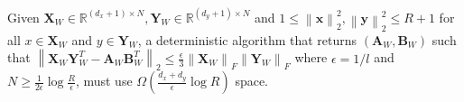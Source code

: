 \begin{theorem}\label{thm:lower-bound-amm-sw}
    Given $\boldsymbol{X}_W\in\mathbb{R}^{(d_x+1)\times N}, \boldsymbol{Y}_W\in\mathbb{R}^{(d_y+1)\times N}$ and $1\leq \left\|\boldsymbol{x}\right\|_2^2, \left\|\boldsymbol{y}\right\|_2^2\leq R+1$ for all $x\in\boldsymbol{X}_W$ and $y\in\boldsymbol{Y}_W$,
    a deterministic algorithm that returns $(\boldsymbol{A}_W, \boldsymbol{B}_W)$ such that
    \(
    \left\| \boldsymbol{X}_W\boldsymbol{Y}_W^T - \boldsymbol{A}_W\boldsymbol{B}_W^T\right\|_2 \leq \frac{\epsilon}{3}\left\|\boldsymbol{X}_W\right\|_F\left\|\boldsymbol{Y}_W\right\|_F
    \)
where $\epsilon = 1/l$ and $N \geq \frac{1}{2\epsilon}\log{\frac{R}{\epsilon}}$, must use $\Omega(\frac{d_x+d_y}{\epsilon}\log{R})$ space.
\end{theorem}








